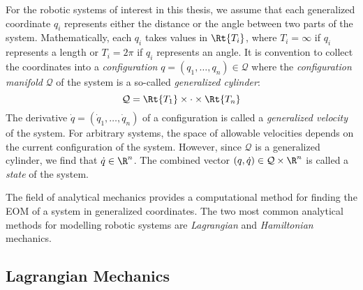 For the robotic systems of interest in this thesis, we assume that
each generalized coordinate \(q_i\) represents either the distance or the angle
between two parts of the system.
Mathematically, each \(q_i\) takes values in \(\Rt{T_i}\), where
\(T_i = \infty\) if \(q_i\) represents a length or \(T_i = 2\pi\) if \(q_i\)
represents an angle.
It is convention to collect the coordinates into a \textit{configuration} 
\(q = (q_1,\ldots,q_n) \in \mathcal{Q}\) 
where the \textit{configuration manifold} \(\mathcal{Q}\) of the system is a
so-called \textit{generalized cylinder}:
\[
    \mathcal{Q} = \Rt{T_1} \times \cdot \times \Rt{T_n}
\] 
The derivative \(\dot{q} = (\dot{q}_1,\ldots,\dot{q}_n)\) of a configuration
is called a \textit{generalized velocity} of the system. For arbitrary systems,
the space of allowable velocities depends on the current configuration of the
system.  However, since \(\mathcal{Q}\) is a generalized cylinder, we find that 
\(\dot{q} \in \R^n\).
The combined vector \((q,\dot{q}) \in \mathcal{Q}\times\R^n\) is called a 
\textit{state} of the system.

The field of analytical mechanics provides a computational method for finding
the EOM of a system in generalized coordinates. The two most common analytical
methods for modelling robotic systems are \textit{Lagrangian} and
\textit{Hamiltonian} mechanics.

\subsection{Lagrangian Mechanics}\label{sec:lagrangian-mechanics}

